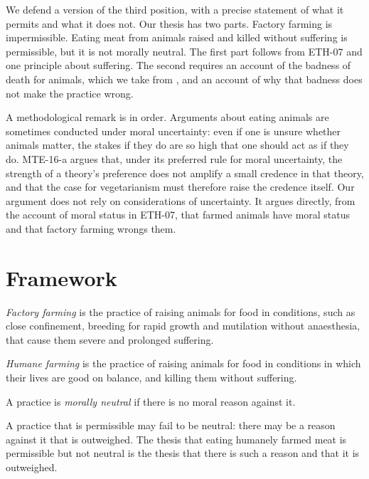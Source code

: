 \documentclass{situationist-preprint}
\begin{document}
We defend a version of the third position, with a precise statement of what it permits and what it does not. Our thesis has two parts. Factory farming is impermissible. Eating meat from animals raised and killed without suffering is permissible, but it is not morally neutral. The first part follows from ETH-07 and one principle about suffering. The second requires an account of the badness of death for animals, which we take from \citet{McMahan2002}, and an account of why that badness does not make the practice wrong.

A methodological remark is in order. Arguments about eating animals are sometimes conducted under moral uncertainty: even if one is unsure whether animals matter, the stakes if they do are so high that one should act as if they do. MTE-16-a argues that, under its preferred rule for moral uncertainty, the strength of a theory's preference does not amplify a small credence in that theory, and that the case for vegetarianism must therefore raise the credence itself. Our argument does not rely on considerations of uncertainty. It argues directly, from the account of moral status in ETH-07, that farmed animals have moral status and that factory farming wrongs them.

\section{Framework}

\begin{definition}\label{d:factory}
\emph{Factory farming} is the practice of raising animals for food in conditions, such as close confinement, breeding for rapid growth and mutilation without anaesthesia, that cause them severe and prolonged suffering.
\end{definition}

\begin{definition}\label{d:humane}
\emph{Humane farming} is the practice of raising animals for food in conditions in which their lives are good on balance, and killing them without suffering.
\end{definition}

\begin{definition}\label{d:neutral}
A practice is \emph{morally neutral} if there is no moral reason against it.
\end{definition}

A practice that is permissible may fail to be neutral: there may be a reason against it that is outweighed. The thesis that eating humanely farmed meat is permissible but not neutral is the thesis that there is such a reason and that it is outweighed.
\end{document}
